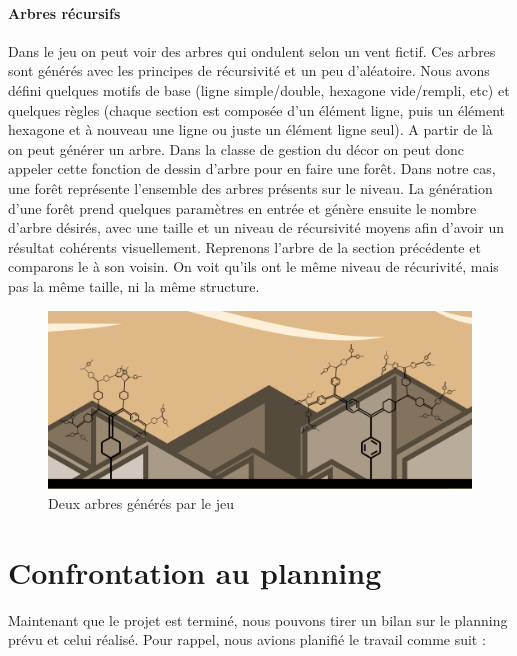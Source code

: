 \documentclass[a4paper,10pt]{article}
\begin{document}
  \paragraph{Arbres récursifs}
  Dans le jeu on peut voir des arbres qui ondulent selon un vent fictif. Ces arbres sont générés avec les principes de récursivité et un peu d'aléatoire. Nous avons défini quelques motifs de base (ligne simple/double, hexagone vide/rempli, etc) et quelques règles (chaque section est composée d'un élément ligne, puis un élément hexagone et à nouveau une ligne ou juste un élément ligne seul). A partir de là on peut générer un arbre. 
Dans la classe de gestion du décor on peut donc appeler cette fonction de dessin d'arbre pour en faire une forêt. Dans notre cas, une forêt représente l'ensemble des arbres présents sur le niveau. La génération d'une forêt prend quelques paramètres en entrée et génère ensuite le nombre d'arbre désirés, avec une taille et un niveau de récursivité moyens afin d'avoir un résultat cohérents visuellement.
  \newline Reprenons l'arbre de la section précédente et comparons le à son voisin. On voit qu'ils ont le même niveau de récurivité, mais pas la même taille, ni la même structure.
 \begin{figure}[!h]
 \centering
 \vspace{-10pt}
 \includegraphics[scale=0.3]{images/trees}
 \caption{Deux arbres générés par le jeu}
 \end{figure}
  
  \pagebreak 
  \section{Confrontation au planning}
  Maintenant que le projet est terminé, nous pouvons tirer un bilan sur le planning prévu et celui réalisé. Pour rappel, nous avions planifié le travail comme suit :
\end{document}
